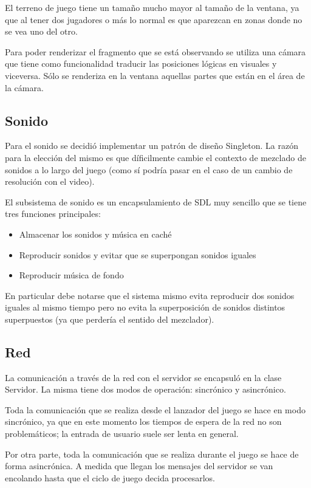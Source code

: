 \documentclass[titlepage,a4paper,12pt]{article}
\begin{document}
El terreno de juego tiene un tamaño mucho mayor al tamaño de la ventana, ya que al tener dos jugadores o más lo normal es que aparezcan en zonas donde no se vea uno del otro. 

Para poder renderizar el fragmento que se está observando se utiliza una cámara que tiene como funcionalidad traducir las posiciones lógicas en visuales y viceversa. Sólo se renderiza en la ventana aquellas partes que están en el área de la cámara. 

\subsection{Sonido}
Para el sonido se decidió implementar un patrón de diseño Singleton. La razón para la elección del mismo es que díficilmente cambie el contexto de mezclado de sonidos a lo largo del juego (como sí podría pasar en el caso de un cambio de resolución con el video).

El subsistema de sonido es un encapsulamiento de SDL muy sencillo que se tiene tres funciones principales:
\begin{itemize}
\item Almacenar los sonidos y música en caché
\item Reproducir sonidos y evitar que se superpongan sonidos iguales
\item Reproducir música de fondo
\end{itemize}

En particular debe notarse que el sistema mismo evita reproducir dos sonidos iguales al mismo tiempo pero no evita la superposición de  sonidos distintos superpuestos (ya que perdería el sentido del mezclador).

\subsection{Red}
La comunicación a través de la red con el servidor se encapsuló en la clase Servidor. La misma tiene dos modos de operación: sincrónico y asincrónico. 

Toda la comunicación que se realiza desde el lanzador del juego se hace en modo sincrónico, ya que en este momento los tiempos de espera de la red no son problemáticos; la entrada de usuario suele ser lenta en general.

Por otra parte, toda la comunicación que se realiza durante el juego se hace de forma asincrónica. A medida que llegan los mensajes del servidor se van encolando hasta que el ciclo de juego decida procesarlos.
\end{document}

